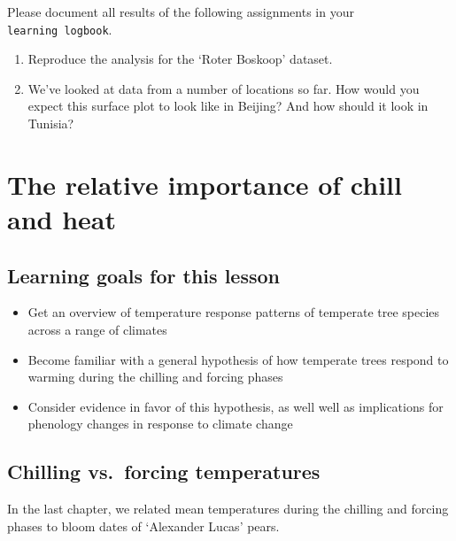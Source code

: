 \documentclass[
]{book}
\providecommand{\tightlist}{%
  \setlength{\itemsep}{0pt}\setlength{\parskip}{0pt}}
\begin{document}
Please document all results of the following assignments in your \texttt{learning\ logbook}.

\begin{enumerate}
\def\labelenumi{\arabic{enumi})}
\tightlist
\item
  Reproduce the analysis for the `Roter Boskoop' dataset.
\item
  We've looked at data from a number of locations so far. How would you expect this surface plot to look like in Beijing? And how should it look in Tunisia?
\end{enumerate}

\hypertarget{pls_chillforce_relimp}{%
\chapter{The relative importance of chill and heat}\label{pls_chillforce_relimp}}

\hypertarget{goals_PLS_chillforce_relimp}{%
\section*{Learning goals for this lesson}\label{goals_PLS_chillforce_relimp}}

\begin{itemize}
\tightlist
\item
  Get an overview of temperature response patterns of temperate tree species across a range of climates
\item
  Become familiar with a general hypothesis of how temperate trees respond to warming during the chilling and forcing phases
\item
  Consider evidence in favor of this hypothesis, as well well as implications for phenology changes in response to climate change
\end{itemize}

\hypertarget{chilling-vs.-forcing-temperatures}{%
\section{Chilling vs.~forcing temperatures}\label{chilling-vs.-forcing-temperatures}}

In the last chapter, we related mean temperatures during the chilling and forcing phases to bloom dates of `Alexander Lucas' pears.
\end{document}
